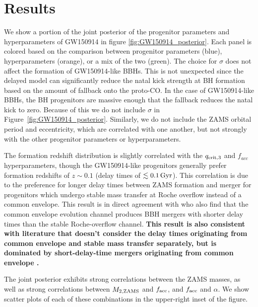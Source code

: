 \documentclass[linenumbers,twocolumn]{aastex631}
\begin{document}
\section{Results}
\label{sec:result}

We show a portion of the joint posterior of the progenitor parameters and
hyperparameters of GW150914 in figure \ref{fig:GW150914_posterior}. Each panel
is colored based on the comparison between progenitor parameters (blue),
hyperparameters (orange), or a mix of the two (green). The choice
for $\sigma$ does not affect the formation of GW150914-like BBHs. This is not
unexpected since the \citet{Fryer2012} delayed model can significantly reduce the
natal kick strength at BH formation based on the amount of fallback onto the
proto-CO. In the case of GW150914-like BBHs, the BH progenitors are massive
enough that the fallback reduces the natal kick to zero. Because of this we do
not include $\sigma$ in Figure~\ref{fig:GW150914_posterior}. Similarly, we do
not include the ZAMS orbital period and eccentricity, which are correlated with
one another, but not strongly with the other progenitor parameters or
hyperparameters. 

The formation redshift distribution is slightly correlated with the $q_{\rm
crit, 3}$ and $f_{acc}$ hyperparameters, though the GW150914-like progenitors
generally prefer formation redshifts of $z\sim0.1$ (delay times of
$\lesssim0.1\,\rm{Gyr}$). This correlation is due to the preference for longer
delay times between ZAMS formation and merger for progenitors which undergo
stable mass transfer at Roche overflow instead of a common envelope. This result
is in direct agreement with \citet{vanSon2022a} who also find that the common
envelope evolution channel produces BBH mergers with shorter delay times than
the stable Roche-overflow channel. \textbf{This result is also consistent with
literature that doesn't consider the delay times originating from common
envelope and stable mass transfer separately, but is dominated by
short-delay-time mergers originating from common envelope
\citep[e.g.][]{OShaughnessy2010, Dominik2012, Eldridge2016, Mapelli2017,
Lamberts2018, Broekgaarden2022}.}

The joint posterior exhibits strong correlations between the ZAMS masses, as well as
strong correlations between $M_{2,\rm{ZAMS}}$ and $f_{\rm{acc}}$, and
$f_{\rm{acc}}$ and $\alpha$. We show scatter plots of each of these combinations
in the upper-right inset of the figure.
\end{document}
